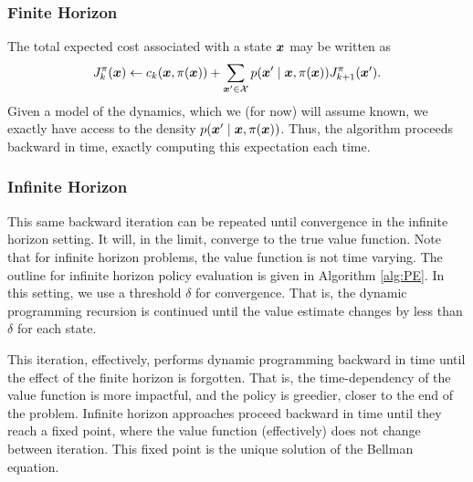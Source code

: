 \subsubsection{Finite Horizon} 

The total expected cost associated with a state $\bm{x}$ may be written as 
\begin{equation}
    J_k^{\pi}(\bm{x}) \gets c_k(\bm{x}, \pi(\bm{x})) + \sum_{\bm{x}' \in \mathcal{X}} p(\bm{x}' \mid \bm{x}, \pi(\bm{x})) J^{\pi}_{k+1}(\bm{x}') \label{eq:fh_pe}. 
\end{equation}
Given a model of the dynamics, which we (for now) will assume known, we exactly have access to the density $p(\bm{x}' \mid \bm{x}, \pi(\bm{x}))$. Thus, the algorithm proceeds backward in time, exactly computing this expectation each time. 

\subsubsection{Infinite Horizon} 

This same backward iteration can be repeated until convergence in the infinite horizon setting. It will, in the limit, converge to the true value function. Note that for infinite horizon problems, the value function is not time varying. The outline for infinite horizon policy evaluation is given in Algorithm \ref{alg:PE}. In this setting, we use a threshold $\delta$ for convergence. That is, the dynamic programming recursion is continued until the value estimate changes by less than $\delta$ for each state. 

This iteration, effectively, performs dynamic programming backward in time until the effect of the finite horizon is forgotten. That is, the time-dependency of the value function is more impactful, and the policy is greedier, closer to the end of the problem. Infinite horizon approaches proceed backward in time until they reach a fixed point, where the value function (effectively) does not change between iteration. This fixed point is the unique solution of the Bellman equation.





